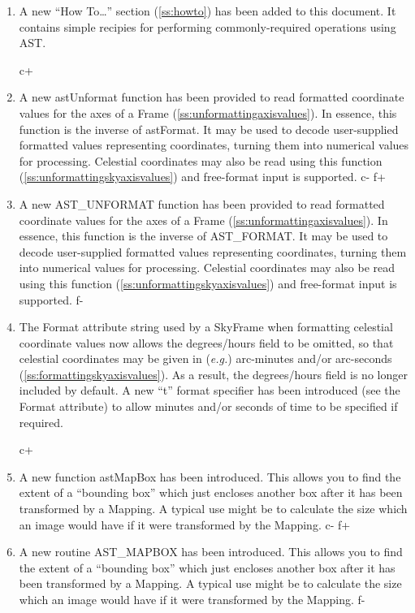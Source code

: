 \documentclass[twoside,11pt]{article}
\newcommand{\secref}[1]{\S\ref{#1}}
\renewcommand{\secref}[1]{\ref{#1}}
\begin{document}
\begin{enumerate}

\item A new ``How To\ldots'' section (\secref{ss:howto}) has been
added to this document. It contains simple recipies for performing
commonly-required operations using AST.

c+
\item A new astUnformat function has been provided to read formatted
coordinate values for the axes of a Frame
(\secref{ss:unformattingaxisvalues}). In essence, this function is the
inverse of astFormat. It may be used to decode user-supplied formatted
values representing coordinates, turning them into numerical values
for processing. Celestial coordinates may also be read using this
function (\secref{ss:unformattingskyaxisvalues}) and free-format input
is supported.
c-
f+
\item A new AST\_UNFORMAT function has been provided to read formatted
coordinate values for the axes of a Frame
(\secref{ss:unformattingaxisvalues}). In essence, this function is the
inverse of AST\_FORMAT. It may be used to decode user-supplied
formatted values representing coordinates, turning them into numerical
values for processing.  Celestial coordinates may also be read using
this function (\secref{ss:unformattingskyaxisvalues}) and free-format
input is supported.
f-

\item The Format attribute string used by a SkyFrame when formatting
celestial coordinate values now allows the degrees/hours field to be
omitted, so that celestial coordinates may be given in ({\em{e.g.}})
arc-minutes and/or arc-seconds
(\secref{ss:formattingskyaxisvalues}). As a result, the degrees/hours
field is no longer included by default.  A new ``t'' format specifier
has been introduced (see the Format attribute) to allow minutes and/or
seconds of time to be specified if required.

c+
\item A new function astMapBox has been introduced. This allows you to
find the extent of a ``bounding box'' which just encloses another box
after it has been transformed by a Mapping. A typical use might be to
calculate the size which an image would have if it were transformed by
the Mapping.
c-
f+
\item A new routine AST\_MAPBOX has been introduced. This allows you
to find the extent of a ``bounding box'' which just encloses another
box after it has been transformed by a Mapping. A typical use might be
to calculate the size which an image would have if it were transformed
by the Mapping.
f-


\end{enumerate}
\end{document}
